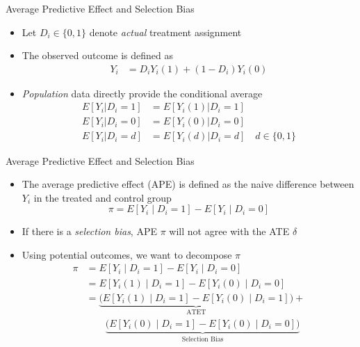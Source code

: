 \documentclass[aspectratio=1610,12pt,xcolor=dvipsnames]{beamer}
\begin{document}
\begin{frame}{Average Predictive Effect and Selection Bias}
\begin{itemize}
\item Let \(D_i \in \{0,1\}\) denote \textit{actual} treatment assignment
\item The observed outcome is defined as
  \begin{align*}
  Y_i &= D_i Y_i(1) + (1 - D_i) Y_i(0)
  \end{align*}
  \item \textit{Population} data directly provide the conditional average
  \begin{align*}
  E[Y_i | D_i=1] &= E[Y_i(1) | D_i=1] \\
  E[Y_i | D_i=0] &= E[Y_i(0) | D_i=0]\\
  E[Y_i | D_i=d] &= E[Y_i(d) | D_i=d]  \quad d \in \{0,1\}
  \end{align*}
\end{itemize}
\end{frame}

\begin{frame}{Average Predictive Effect and Selection Bias}
\begin{itemize}
    \item The average predictive effect (APE) is defined as the naive difference between $Y_i$ in the treated and control group
  \[
  \pi = E[Y_i \mid D_i=1] - E[Y_i \mid D_i=0]
  \]
  \item If there is a \textit{selection bias}, APE $\pi$ will not agree with the ATE $\delta$ 
  \item Using potential outcomes, we want to decompose $\pi$
    \begin{align*}
    \pi &= E[Y_i \mid D_i=1] - E[Y_i \mid D_i=0] \\ 
    &= E[Y_i(1) \mid D_i=1] - E[Y_i(0) \mid D_i=0] \\
    &= \underbrace{\big(E[Y_i(1) \mid D_i=1] - E[Y_i(0) \mid D_i=1]\big)}_{\text{ATET}}
    + \\ &\hspace{2em} \underbrace{\big(E[Y_i(0) \mid D_i=1] - E[Y_i(0) \mid D_i=0]\big)}_{\text{Selection Bias}}
    \end{align*}
\end{itemize}
\end{frame}
\end{document}
